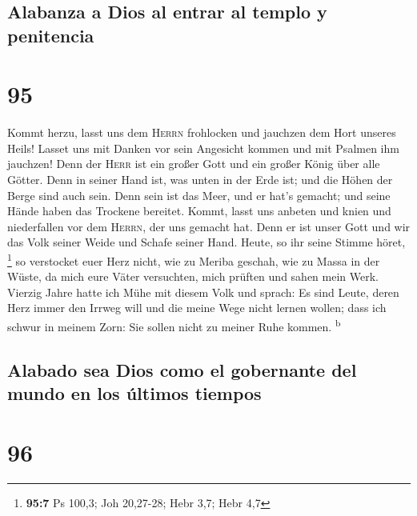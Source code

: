 \hypertarget{alabanza-a-dios-al-entrar-al-templo-y-penitencia}{%
\subsection{Alabanza a Dios al entrar al templo y
penitencia}\label{alabanza-a-dios-al-entrar-al-templo-y-penitencia}}

\hypertarget{section-94}{%
\section{95}\label{section-94}}

 Kommt herzu, lasst uns dem \textsc{Herrn} frohlocken und
jauchzen dem Hort unseres Heils!  Lasset uns mit Danken
vor sein Angesicht kommen und mit Psalmen ihm jauchzen! 
Denn der \textsc{Herr} ist ein großer Gott und ein großer König über
alle Götter.  Denn in seiner Hand ist, was unten in der
Erde ist; und die Höhen der Berge sind auch sein.  Denn
sein ist das Meer, und er hat's gemacht; und seine Hände haben das
Trockene bereitet.  Kommt, lasst uns anbeten und knien und
niederfallen vor dem \textsc{Herrn}, der uns gemacht hat. 
Denn er ist unser Gott und wir das Volk seiner Weide und Schafe seiner
Hand. Heute, so ihr seine Stimme höret, \footnote{\textbf{95:7} Ps
  100,3; Joh 20,27-28; Hebr 3,7; Hebr 4,7}  so verstocket
euer Herz nicht, wie zu Meriba geschah, wie zu Massa in der Wüste,
 da mich eure Väter versuchten, mich prüften und sahen
mein Werk.  Vierzig Jahre hatte ich Mühe mit diesem Volk
und sprach: Es sind Leute, deren Herz immer den Irrweg will und die
meine Wege nicht lernen wollen;  dass ich schwur in
meinem Zorn: Sie sollen nicht zu meiner Ruhe kommen. \textsuperscript{b}

\hypertarget{alabado-sea-dios-como-el-gobernante-del-mundo-en-los-uxfaltimos-tiempos}{%
\subsection{Alabado sea Dios como el gobernante del mundo en los últimos
tiempos}\label{alabado-sea-dios-como-el-gobernante-del-mundo-en-los-uxfaltimos-tiempos}}

\hypertarget{section-95}{%
\section{96}\label{section-95}}

